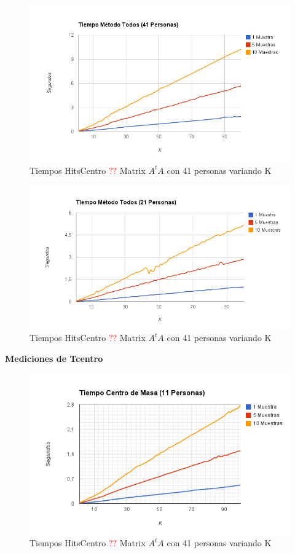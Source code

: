 \begin{figure}[H]
\includegraphics[width=1\textwidth]{img/imagef5.png}
     \caption{Tiempos HitsCentro \textcolor{red}{??} Matrix $A^tA$ con 41 personas variando K}
     \label{fig:figura1}
\end{figure}

\begin{figure}[H]
\includegraphics[width=1\textwidth]{img/imagef6.png}
     \caption{Tiempos HitsCentro \textcolor{red}{??} Matrix $A^tA$ con 41 personas variando K}
     \label{fig:figura1}
\end{figure}


\textbf{Mediciones de Tcentro }

\begin{figure}[H]
\includegraphics[width=1\textwidth]{img/imagef7.png}
     \caption{Tiempos HitsCentro \textcolor{red}{??} Matrix $A^tA$ con 41 personas variando K}
     \label{fig:figura1}
\end{figure}

